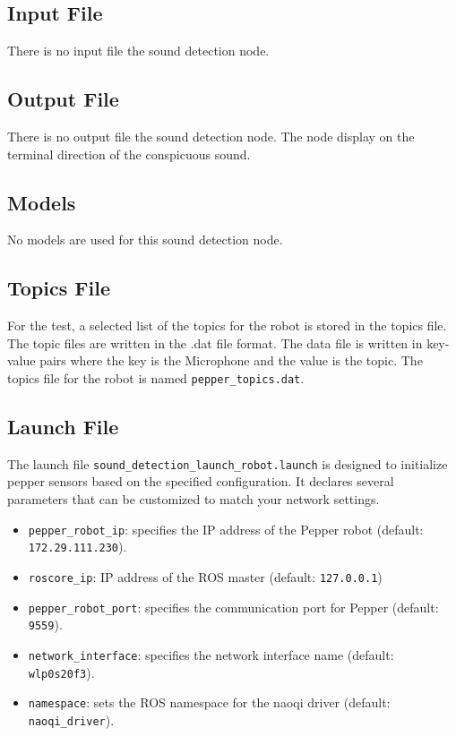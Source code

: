 \documentclass{CSSRforAfrica}
\begin{document}
\subsection*{Input File}
There is no input file the sound detection node.

\subsection*{Output File}
There is no output file the sound detection node. The node display on the terminal direction of the conspicuous sound.

\subsection*{Models}
No models are used for this sound detection node.

\subsection*{Topics File} 
For the test, a selected list of the topics for the robot is stored in the topics file. The topic files are 
written in the .dat file format. The data file is written in key-value pairs where the key is the Microphone  
and the value is the topic. The topics file for the robot is named \texttt{pepper\_topics.dat}.

\subsection*{Launch File}
The launch file \texttt{sound\_detection\_launch\_robot.launch} is designed to initialize pepper sensors based on the specified configuration. It declares several parameters that can be customized to match your network settings.
\begin{itemize}
	\setlength\itemsep{0em}
	\item \texttt{pepper\_robot\_ip}: specifies the IP address of the Pepper robot (default: \texttt{172.29.111.230}).
	\item \texttt{roscore\_ip}: IP address of the ROS master (default: \texttt{127.0.0.1})
	\item \texttt{pepper\_robot\_port}: specifies the communication port for Pepper (default: \texttt{9559}).
	\item \texttt{network\_interface}: specifies the network interface name (default: \texttt{wlp0s20f3}).
	\item \texttt{namespace}: sets the ROS namespace for the naoqi driver (default: \texttt{naoqi\_driver}).
\end{itemize}
\end{document}
